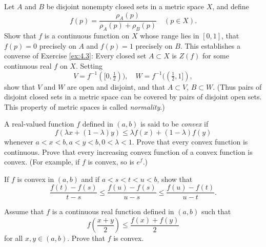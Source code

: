 \begin{myExercise}
    \label{ex:4.22}
    Let $A$ and $B$ be disjoint nonempty closed sets in a metric space $X$, and define
    \begin{equation*}
        f(p) = \frac{\rho_A(p)}{\rho_A(p) + \rho_B(p)}
        \quad 
        (p \in X).
    \end{equation*}
    Show that $f$ is a continuous function on $X$ whose range lies in $[0, 1]$, that $f(p) = 0$ precisely on $A$ and $f(p) = 1$ precisely on $B$. 
    This establishes a converse of Exercise \ref{ex:4.3}: 
    Every closed set $A \subset X$ is $Z(f)$ for some continuous real $f$ on $X$. 
    Setting 
    \begin{equation*}
        V = f^{-1}([0, \tfrac{1}{2})), 
        \quad 
        W = f^{-1}((\tfrac{1}{2}, 1]),
    \end{equation*}
    show that $V$ and $W$ are open and disjoint, 
    and that $A \subset V$, $B \subset W$. 
    (Thus pairs of disjoint closed sets in a metric space can be covered by pairs of disjoint open sets. 
    This property of metric spaces is called \emph{normality}.)
\end{myExercise}


\begin{myExercise}
    \label{ex:4.23}
    A real-valued function $f$ defined in $(a, b)$ is said to be \emph{convex} if
    \begin{equation*}
        f(\lambda x + (1-\lambda)y) \leq
        \lambda f(x) + (1-\lambda)f(y)
    \end{equation*}
    whenever $a < x < b, a < y < b, 0 < \lambda < 1$. 
    Prove that every convex function is continuous. 
    Prove that every increasing convex function of a convex function is convex. 
    (For example, if $f$ is convex, so is $e^f$.)

    If $f$ is convex in $(a, b)$ and if $a< s < t < u < b$, show that
    \begin{equation*}
        \frac{f(t) - f(s)}{t - s} \leq
        \frac{f(u) - f(s)}{u - s} \leq
        \frac{f(u) - f(t)}{u - t}  .
    \end{equation*}
\end{myExercise}


\begin{myExercise}
    \label{ex:4.24}
    Assume that $f$ is a continuous real function defined in $(a, b)$ such that
    \begin{equation*}
        f\left( \frac{x+y}{2} \right) \leq 
        \frac{f(x) + f(y)}{2}
    \end{equation*}
    for all $x, y \in  (a, b)$. 
    Prove that $f$ is convex.
\end{myExercise}


